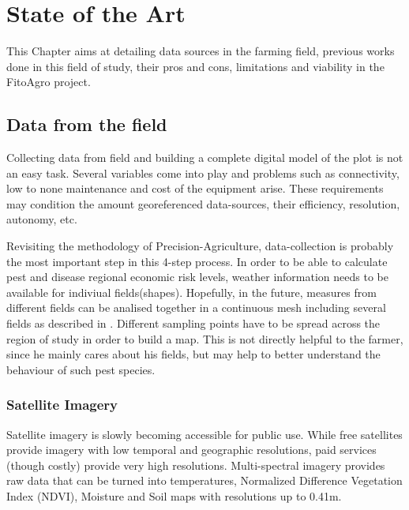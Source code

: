 \chapter{State of the Art}
\label{cha:state_of_the_art}

This Chapter aims at detailing data sources in the farming field, previous works done in this field of study, their pros and cons, limitations and viability in the FitoAgro project.

\section{Data from the field} %
\label{sec:state_of_the_art_data}


Collecting data from field and building a complete digital model of the plot is not an easy task. Several variables come into play and problems such as connectivity, low to none maintenance and cost of the equipment arise. These requirements may condition the amount georeferenced data-sources, their efficiency, resolution, autonomy, etc.

Revisiting the methodology of Precision-Agriculture, data-collection is probably the most important step in this 4-step process. In order to be able to calculate pest and disease regional economic risk levels, weather information needs to be available for indiviual fields(shapes). Hopefully, in the future, measures from different fields can be analised together in a continuous mesh including several fields as described in \cite{Ojha2015}. Different sampling points have to be spread across the region of study in order to build a map. This is not directly helpful to the farmer, since he mainly cares about his fields, but may help to better understand the behaviour of such pest species.

\subsection{Satellite Imagery}
\label{sec:satellite_imagery}

Satellite imagery is slowly becoming accessible for public use. While free satellites provide imagery with low temporal and geographic resolutions, paid services (though costly) provide very high resolutions. Multi-spectral imagery provides raw data that can be turned into temperatures, Normalized Difference Vegetation Index (NDVI), Moisture and Soil maps with resolutions up to 0.41m.

